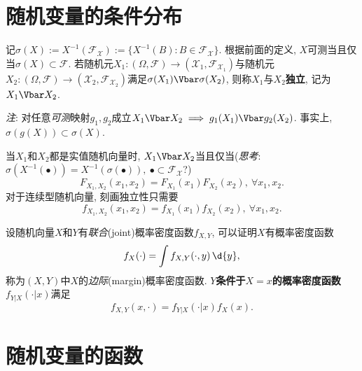 \section{随机变量的条件分布}

记$\sigma(X) := X^{-1}(\mathscr{F}_{\mathcal{X}}) := \{X^{-1}(B):B\in\mathscr{F}_{\mathcal{X}}\}$. 根据前面的定义, $X$可测当且仅当$\sigma(X) \subset \mathscr{F}$. 若随机元$X_{1} : (\Omega,\mathscr{F}) \to (\mathcal{X}_{1},\mathscr{F}_{\mathcal{X}_{1}})$与随机元$X_{2} : (\Omega,\mathscr{F}) \to (\mathcal{X}_{2},\mathscr{F}_{\mathcal{X}_{2}})$满足$\sigma(X_{1})\indep\sigma(X_{2})$, 则称$X_{1}$与$X_{2}$\textbf{独立}, 记为$X_{1} \indep X_{2}$.

\emph{注}: 对任意\emph{可测}映射$g_{1},g_{2}$成立$X_{1} \indep X_{2} \implies g_{1}(X_{1}) \indep g_{2}(X_{2})$. 事实上, $\sigma(g(X)) \subset \sigma(X)$.

当$X_{1}$和$X_{2}$都是实值随机向量时, $X_{1} \indep X_{2}$当且仅当(\emph{思考}: $\sigma(X^{-1}(\bullet)) = X^{-1}(\sigma(\bullet)), \ \bullet\subset\mathscr{F}_{\mathcal{X}}$?)
\[ F_{X_{1},X_{2}}(x_{1},x_{2}) = F_{X_{1}}(x_{1})F_{X_{2}}(x_{2}), \ \forall x_{1},x_{2}. \]
对于连续型随机向量, 刻画独立性只需要
\[ f_{X_{1},X_{2}}(x_{1},x_{2}) = f_{X_{1}}(x_{1})f_{X_{2}}(x_{2}), \ \forall x_{1},x_{2}. \]

设随机向量$X$和$Y$有\emph{联合}(joint)概率密度函数$f_{X,Y}$, 可以证明$X$有概率密度函数
\[ f_{X}(\cdot) = \int f_{X,Y}(\cdot,y) \,\d{y}, \] 称为$(X,Y)$中$X$的\emph{边际}(margin)概率密度函数. \textbf{$Y$条件于$X=x$的概率密度函数}$f_{Y|X}(\cdot|x)$满足
\[ f_{X,Y}(x,\cdot) = f_{Y|X}(\cdot|x)f_{X}(x). \]

\section{随机变量的函数}

